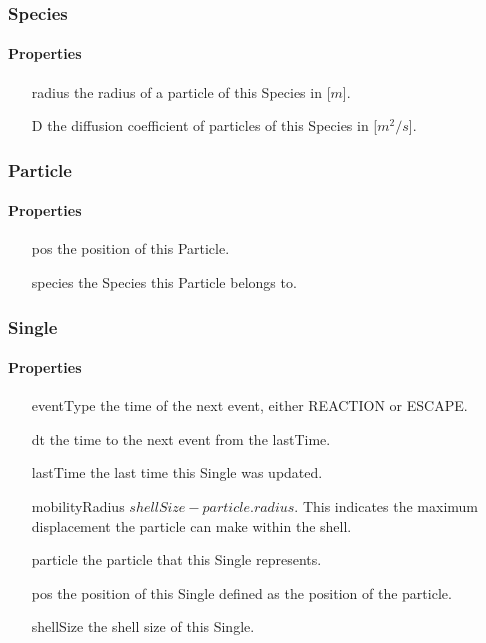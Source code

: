 \documentclass[english]{article}
\begin{document}
\subsubsection{Species}

\paragraph{Properties}

\begin{itemize}
\item[radius] the radius of a particle of this Species in [$m$].
\item[D] the diffusion coefficient of particles of this Species in [$m^2/s$].
\end{itemize}

\subsubsection{Particle}

\paragraph{Properties}

\begin{itemize}
\item[pos] the position of this Particle.
\item[species] the Species this Particle belongs to.
\end{itemize}

\subsubsection{Single}

\paragraph{Properties}

\begin{itemize}
\item[eventType] the time of the next event, either REACTION or ESCAPE.
\item[dt] the time to the next event from the lastTime.
\item[lastTime] the last time this Single was updated.
\item[mobilityRadius] $shellSize - particle.radius$.  This
  indicates the maximum displacement the particle can make within the
  shell.
\item[particle] the particle that this Single represents.
\item[pos] the position of this Single defined as the position of the
  particle.
\item[shellSize] the shell size of this Single.


\end{itemize}
\end{document}
